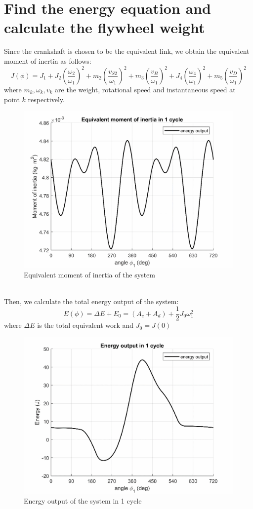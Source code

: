 \section{Find the energy equation and calculate the flywheel weight}
Since the crankshaft is chosen to be the equivalent link, we obtain the equivalent moment of inertia as follows:
\begin{equation}
	J(\phi)=J_1+J_2\left(\dfrac{\omega_2}{\omega_1}\right)^2+m_2\left(\dfrac{v_{S2}}{\omega_1}\right)^2+m_3\left(\dfrac{v_{B}}{\omega_1}\right)^2+J_4\left(\dfrac{\omega_4}{\omega_1}\right)^2+m_5\left(\dfrac{v_{D}}{\omega_1}\right)^2
\end{equation}
where $ m_k,\omega_k,v_k $ are the weight, rotational speed and instantaneous speed at point $ k $ respectively.
\begin{figure}[h]
	\centering
	\includegraphics[width=0.6\linewidth]{19}
	\caption{Equivalent moment of inertia of the system}
	\label{fig:19}
\end{figure}\\
Then, we calculate the total energy output of the system:
\begin{equation}
	E(\phi)=\Delta E + E_0 = (A_c+A_d) + \dfrac{1}{2}J_0\omega_1^2
\end{equation}
where $ \Delta E $ is the total equivalent work and $ J_0 = J(0)$
\begin{figure}
	\centering
	\includegraphics[width=0.6\linewidth]{20}
	\caption{Energy output of the system in 1 cycle}
	\label{fig:20}
\end{figure}\\
